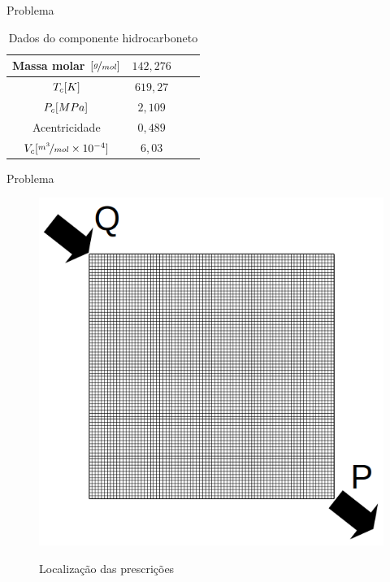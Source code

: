 \documentclass[professionalfont]{beamer}
\begin{document}
\begin{frame}{Problema \theproblem}
    \small
    \begin{table}[!ht]
        \centering
        \begin{subtable}{\textwidth}
            \centering
            \begin{tabular}{|c|c|c|c|}
                \hline
                Massa molar $[\nicefrac{g}{mol}]$ & $142,276$ \\
                \hline
                $T_{c} [K]$ & $619,27 $\\
                \hline
                $P_{c}[MPa]$ & $2,109$\\
                \hline
                Acentricidade & $0,489$\\
                \hline
                $V_{c} [\nicefrac{m^{3}}{mol} \times 10^{-4}]$ & $6,03$\\
                \hline            
            \end{tabular}
            \caption{Dados do componente hidrocarboneto}
            \label{tab:table_prob4.c}
        \end{subtable}
    \end{table}
\end{frame}

\newcommand{\FrameProblemName}{Problema \theproblem}
\begin{frame}{\FrameProblemName}
    \begin{figure}
        \centering
        \caption{Localização das prescrições}
        \includegraphics[scale=0.25]{./imgs/prescricao.png}
        \label{fig:fig3_pr4}
    \end{figure}
\end{frame}
\end{document}
